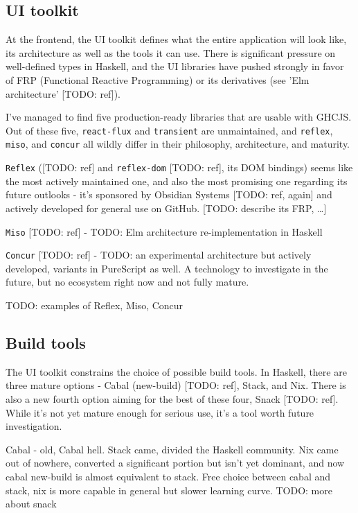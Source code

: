 \documentclass[english,odsaz]{fitthesis}
\begin{document}
\subsection{UI toolkit}
\label{sec:org8cf5adc}
At the frontend, the UI toolkit defines what the entire application will look
like, its architecture as well as the tools it can use. There is significant
pressure on well-defined types in Haskell, and the UI libraries have pushed
strongly in favor of FRP (Functional Reactive Programming) or its derivatives
(see 'Elm architecture' [TODO: ref]).

I've managed to find five production-ready libraries that are usable with
GHCJS. Out of these five, \texttt{react-flux} and \texttt{transient} are unmaintained, and \texttt{reflex},
\texttt{miso}, and \texttt{concur} all wildly differ in their philosophy, architecture, and
maturity.

\texttt{Reflex} ([TODO: ref] and \texttt{reflex-dom} [TODO: ref], its DOM bindings) seems like the
most actively maintained one, and also the most promising one regarding its
future outlooks - it's sponsored by Obsidian Systems [TODO: ref, again] and
actively developed for general use on GitHub. [TODO: describe its FRP, \ldots{}]

\texttt{Miso} [TODO: ref] - TODO: Elm architecture re-implementation in Haskell

\texttt{Concur} [TODO: ref] - TODO: an experimental architecture but actively developed,
variants in PureScript as well. A technology to investigate in the future, but
no ecosystem right now and not fully mature.

TODO: examples of Reflex, Miso, Concur

\subsection{Build tools}
\label{sec:org8ca7010}
The UI toolkit constrains the choice of possible build tools. In Haskell, there
are three mature options - Cabal (new-build) [TODO: ref], Stack, and Nix. There
is also a new fourth option aiming for the best of these four, Snack [TODO:
ref]. While it's not yet mature enough for serious use, it's a tool worth future
investigation.

Cabal - old, Cabal hell. Stack came, divided the Haskell community. Nix came out
of nowhere, converted a significant portion but isn't yet dominant, and now
cabal new-build is almost equivalent to stack. Free choice between cabal and
stack, nix is more capable in general but slower learning curve. TODO: more
about snack
\end{document}
